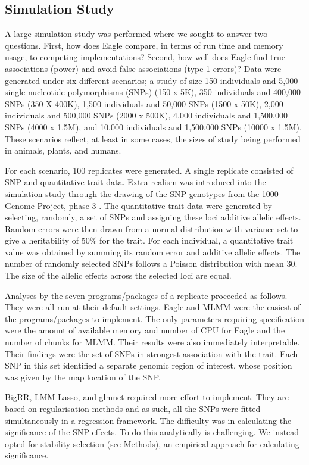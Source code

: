 \documentclass{article}
\begin{document}
\subsection{Simulation Study}
A large simulation study was performed where we sought to  answer two questions. 
First, how does Eagle compare, in terms of run time and memory usage, to 
competing implementations? Second, how well does Eagle find true associations (power) and avoid 
false associations (type 1 errors)? Data were generated under six different scenarios; a study of size 150 individuals 
and 5,000 single nucleotide polymorphisms (SNPs) (150 x 5K),  350 individuals and 400,000 SNPs (350 X 400K),  1,500 individuals and 
50,000 SNPs (1500 x 50K), 2,000 individuals and 500,000 SNPs (2000 x 500K), 4,000 individuals and 
1,500,000 SNPs (4000 x 1.5M), and 10,000 individuals and 1,500,000 SNPs (10000 x 1.5M).   
These scenarios reflect, at least in some cases, the sizes of study being performed in animals, plants, and humans.  

For each scenario, 100 replicates were generated. A single replicate consisted of SNP and quantitative trait data. 
Extra realism was introduced into the simulation study through the drawing of the SNP genotypes from the 1000 Genome Project, phase 3  \cite{10002010map}.
 The quantitative trait data were generated 
by selecting, randomly, a set of SNPs and assigning these loci additive allelic effects.  Random errors were then drawn from a normal distribution 
with variance set to give a heritability of 50\% for the trait. 
For each individual, a quantitative trait value was obtained by summing its random error and additive allelic effects. 
The number of randomly selected SNPs follows a Poisson distribution with mean 30. The size of the allelic effects 
 across the selected loci are equal.  
 
 Analyses by the seven programs/packages of a replicate proceeded as follows. They were all run at their default settings. 
 Eagle and MLMM were the easiest of the programs/packages to implement. 
 The only parameters requiring specification were the amount of available memory and number of CPU for 
 Eagle and the number of chunks for MLMM. 
 Their results were also immediately 
 interpretable. Their findings were the set of SNPs in strongest association with the trait. Each 
SNP in this set identified a separate genomic region of interest, whose position was given by the map location of the SNP.  

BigRR, LMM-Lasso, and glmnet required more effort to implement. They are based on regularisation methods and as such, all the SNPs were fitted simultaneously in a regression 
framework. The difficulty was in calculating the significance of the SNP effects. To do this analytically is challenging. We instead opted for stability selection (see Methods),  
an empirical approach for calculating significance. 
\end{document}
